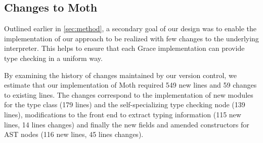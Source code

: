 \subsection{Changes to Moth}
\label{sec:eval-changes}

Outlined earlier in \cref{sec:method}, a secondary
goal of our design was to enable the implementation of our approach to be
realized with few changes to the underlying interpreter.
This helps to ensure that each Grace implementation
can provide type checking in a uniform way.

By examining the history of changes maintained by our version control,
we estimate that our implementation of Moth required
549 new lines and 59 changes to existing lines.
The changes correspond to the implementation of
new modules for the type class (179 lines) and
the self-specializing type checking node (139 lines),
modifications to the front end to extract typing information
(115 new lines, 14 lines changes)
and finally the new fields and amended constructors for AST nodes
(116 new lines, 45 lines changes).




